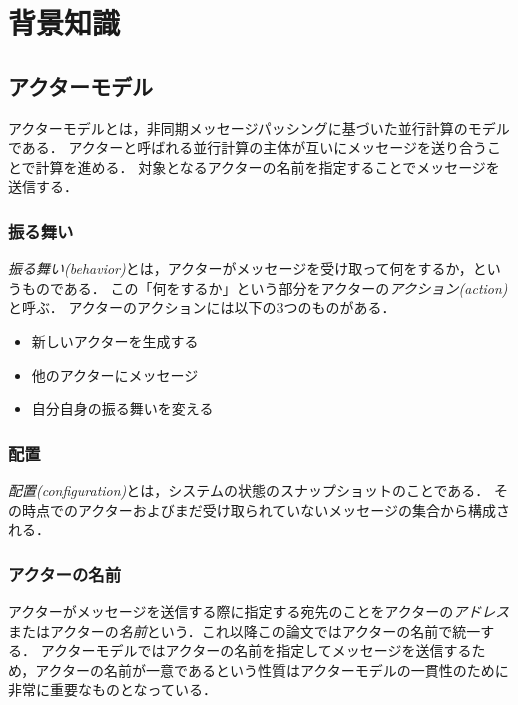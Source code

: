 \chapter{背景知識}
\label{chapter:background}

\section{アクターモデル}

アクターモデル\cite{Agha:1986aa}とは，非同期メッセージパッシングに基づいた並行計算のモデルである．
アクターと呼ばれる並行計算の主体が互いにメッセージを送り合うことで計算を進める．
対象となるアクターの名前を指定することでメッセージを送信する．


\subsection{振る舞い}

\emph{振る舞い(behavior)}とは，アクターがメッセージを受け取って何をするか，というものである．
この「何をするか」という部分をアクターの\emph{アクション(action)}と呼ぶ．
アクターのアクションには以下の3つのものがある．

\begin{itemize}
\item 新しいアクターを生成する
\item 他のアクターにメッセージ
\item 自分自身の振る舞いを変える
\end{itemize}


\subsection{配置}

\emph{配置(configuration)}とは，システムの状態のスナップショットのことである．
その時点でのアクターおよびまだ受け取られていないメッセージの集合から構成される．

\subsection{アクターの名前}

アクターがメッセージを送信する際に指定する宛先のことをアクターの\emph{アドレス}またはアクターの\emph{名前}という．これ以降この論文ではアクターの名前で統一する．
アクターモデルではアクターの名前を指定してメッセージを送信するため，アクターの名前が一意であるという性質はアクターモデルの一貫性のために非常に重要なものとなっている．

